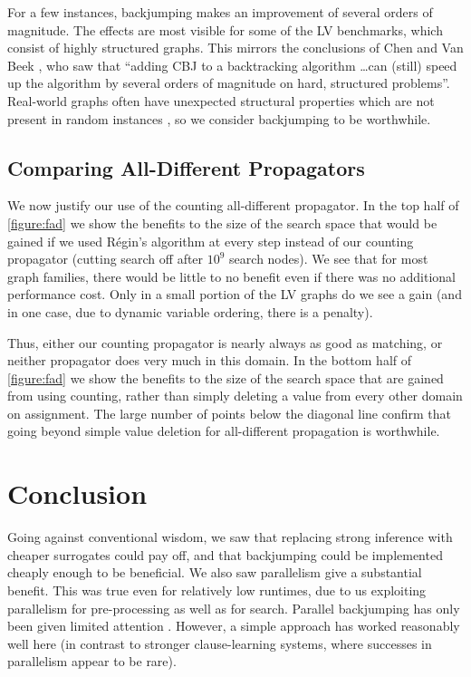 \documentclass{llncs}
\begin{document}
For a few instances, backjumping makes an improvement of several orders of magnitude. The effects
are most visible for some of the LV benchmarks, which consist of highly structured graphs. This
mirrors the conclusions of Chen and Van Beek \cite{Chen:2001}, who saw that ``adding CBJ to a
backtracking algorithm \ldots can (still) speed up the algorithm by several orders of magnitude on
hard, structured problems''.  Real-world graphs often have unexpected structural properties which
are not present in random instances \cite{MacIntyre:1998,Slater:2014}, so we consider backjumping to
be worthwhile.

\subsection{Comparing All-Different Propagators}

We now justify our use of the counting all-different propagator. In the top half of
\cref{figure:fad} we show the benefits to the size of the search space that would be gained if we
used R\'egin's algorithm at every step instead of our counting propagator (cutting search off after
$10^9$ search nodes). We see that for most graph families, there would be little to no benefit even
if there was no additional performance cost. Only in a small portion of the LV graphs do we see a
gain (and in one case, due to dynamic variable ordering, there is a penalty).

Thus, either our counting propagator is nearly always as good as matching, or neither propagator
does very much in this domain. In the bottom half of \cref{figure:fad} we show the benefits to the
size of the search space that are gained from using counting, rather than simply deleting a value
from every other domain on assignment. The large number of points below the diagonal line confirm
that going beyond simple value deletion for all-different propagation is worthwhile.

\section{Conclusion}

Going against conventional wisdom, we saw that replacing strong inference with cheaper surrogates
could pay off, and that backjumping could be implemented cheaply enough to be beneficial. We also
saw parallelism give a substantial benefit. This was true even for relatively low runtimes, due to
us exploiting parallelism for pre-processing as well as for search.  Parallel backjumping has only
been given limited attention \cite{Conrad:1994,Habbas:1997,Cope:2000}.  However, a simple approach
has worked reasonably well here (in contrast to stronger clause-learning systems, where successes in
parallelism appear to be rare).
\end{document}

